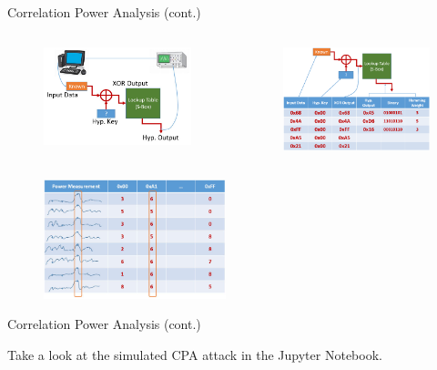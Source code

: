 \documentclass[handout]{beamer}
\begin{document}
\begin{frame}{Correlation Power Analysis (cont.)}

\begin{columns}


\begin{figure}
\includegraphics[width=150pt]{figures/cpa-measurement-setup.png}
\end{figure}



\begin{figure}
\includegraphics[width=150pt]{figures/cpa-measurement-data.png}
\end{figure}

\end{columns}

\begin{figure}
\includegraphics[width=150pt]{figures/cpa-measurement-correlation.png}
\end{figure}


\end{frame}


\begin{frame}{Correlation Power Analysis (cont.)}

\footnotesize
Take a look at the simulated CPA attack in the Jupyter Notebook.

\end{frame}
\end{document}
